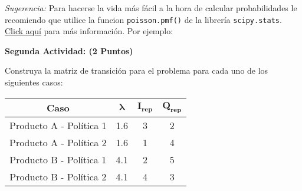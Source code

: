 \documentclass[ a4paper, twoside, 11pt]{article}
\begin{document}
\begin{problem}

\emph{Sugerencia:} Para hacerse la vida m\'as f\'acil a la hora de calcular probabilidades le recomiendo que utilice la funcion {\tt poisson.pmf()} de la librer\'ia {\tt scipy.stats}. \href{https://docs.scipy.org/doc/scipy/reference/generated/scipy.stats.poisson.html}{Click aqu\'i} para m\'as informaci\'on. Por ejemplo: 
\halfskip


\textbf{Segunda Actividad: (2 Puntos)}

Construya la matriz de transici\'on para el problema para cada uno de los siguientes casos: 
\begin{table}[htb]
\centering
\begin{tabular}{|c|c|c|c|}
\hline
\textbf{Caso}           & $\bm{\lambda}$ & $\bm{I_{rep}}$ & $\bm{Q_{rep}}$ \\ \hline
Producto A - Pol\'itica 1 & 1.6                & 3                  & 2                  \\ \hline
Producto A - Pol\'itica 2 & 1.6                & 1                  & 4                  \\ \hline
Producto B - Pol\'itica 1 & 4.1                & 2                  & 5                  \\ \hline
Producto B - Pol\'itica 2 & 4.1                & 4                  & 3                  \\ \hline
\end{tabular}
\end{table}


\end{problem}
\end{document}
